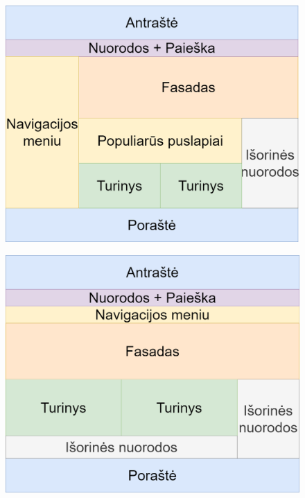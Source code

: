 \documentclass{VUMIFPSbakalaurinis}
\begin{document}


\begin{figure}[htb]
\centering
\begin{minipage}{.5\textwidth}
  \centering
  \includegraphics[width=0.9\linewidth]{img/PuslapioArchPagrindinis}
  \label{img:PuslapioArchPagrindinis}
\end{minipage}%
\begin{minipage}{.5\textwidth}
  \centering
  \includegraphics[width=0.9\linewidth]{img/PuslapioArchPagrindinisHorizontalus}
  \label{img:PuslapioArchPagrindinisHorizontalus}
\end{minipage}
\end{figure}
\end{document}
